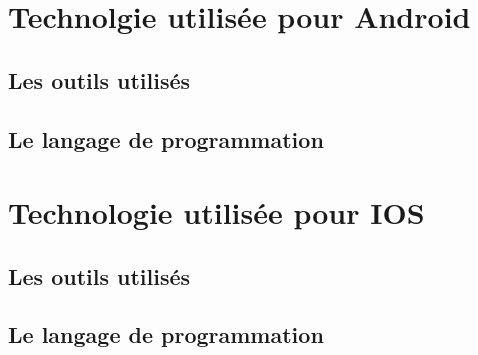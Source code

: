 \section{Technolgie utilisée pour Android}

\subsection{Les outils utilisés}


\subsection{Le langage de programmation}


\section{Technologie utilisée pour IOS}

\subsection{Les outils utilisés}


\subsection{Le langage de programmation}



